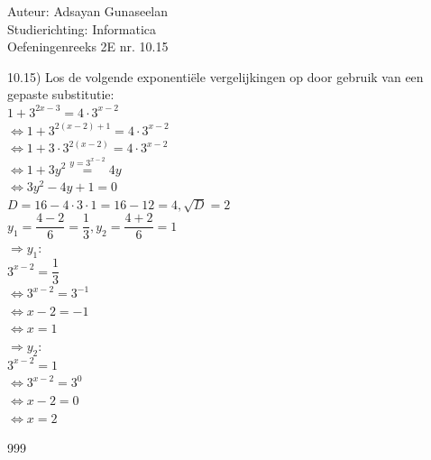 \documentclass[a4paper]{article}
\begin{document}
\noindent \large Auteur: Adsayan Gunaseelan \\
\noindent \large Studierichting: Informatica\\
\noindent \large Oefeningenreeks 2E nr. 10.15\\

\medskip

\normalsize
10.15) Los de volgende exponentiële vergelijkingen op door gebruik van een gepaste substitutie:\\

$1+3^{2x-3} = 4\cdot3^{x-2}$\\

$\Leftrightarrow 1+3^{2(x-2)+1} = 4\cdot3^{x-2}$\\

$\Leftrightarrow 1+3\cdot3^{2(x-2)} = 4\cdot3^{x-2}$\\

$\Leftrightarrow 1+3y^2 \overset{y=3^{x-2}}{=} 4y$\\

$\Leftrightarrow 3y^2 -4y +1 = 0$\\

$D = 16 - 4\cdot 3 \cdot 1 = 16 - 12 = 4, \sqrt{D} = 2$\\

$y_1 = \dfrac{4-2}{6} = \dfrac{1}{3}, y_2 = \dfrac{4+2}{6} = 1$\\

$\Rightarrow y_1$:\\

$3^{x-2} = \dfrac{1}{3}$\\

$\Leftrightarrow 3^{x-2} = 3^{-1}$\\

$\Leftrightarrow x-2 = -1$\\

$\Leftrightarrow x = 1$\\


$\Rightarrow y_2$:\\

$3^{x-2} = 1$\\

$\Leftrightarrow 3^{x-2} = 3^{0}$\\

$\Leftrightarrow x-2 = 0$\\

$\Leftrightarrow x = 2$\\

\begin{thebibliography}{999}
\end{thebibliography}
\end{document}
